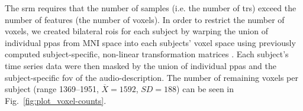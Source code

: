 






The \ac{srm} requires that the number of samples (i.e. the number of \acp{tr})
exceed the number of features (the number of voxels).
%
In order to restrict the number of voxels, we created bilateral \acp{roi} for
each subject by warping the union of individual \acp{ppa}
\citep[s.][]{haeusler2022processing} from MNI space into each subjects' voxel
space using previously computed subject-specific, non-linear transformation
matrices
\citep[][\href{https://github.com/psychoinformatics-de/studyforrest-data-templatetransforms
}{\url{github.com/psychoinformatics-de/studyforrest-data-templatetransforms}}]{hanke2014audiomovie}.
Each subject's time series data were then masked by the union of individual
\acp{ppa} and the subject-specific \ac{fov} of the audio-description.
The number of remaining voxels per subject (range 1369--1951,
$\overline{X}=1592$, $SD=188$) can be seen in Fig.~\ref{fig:plot_voxel-counts}.


